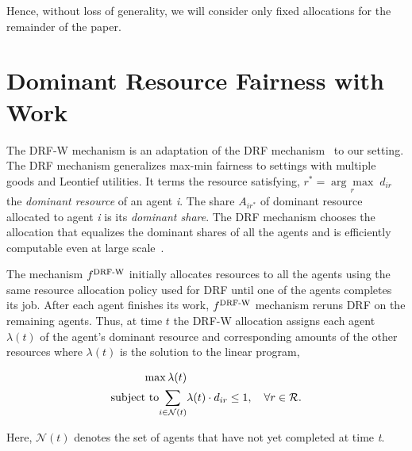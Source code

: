 \documentclass[letterpaper]{article} %
\theoremstyle{definition}
\begin{document}
Hence, without loss of generality, we will consider only fixed allocations for the remainder of the paper. 

\section{Dominant Resource Fairness with Work} \label{drf-w}
The DRF-W mechanism is an adaptation of the DRF mechanism~\cite{Ghodsi2011drf,parkes2015beyond} to our setting.
The DRF mechanism generalizes max-min fairness to settings with multiple goods and Leontief utilities.
It terms the resource satisfying, $r^{*} = \underset{r}{\arg \max} \; d_{ir}$ the {\em dominant resource} of an agent \textit{i}. The share $A_{ir^{*}}$ of dominant resource allocated to agent \textit{i} is its {\em dominant share}. The DRF mechanism chooses the allocation that equalizes the dominant shares of all the agents and is efficiently computable even at large scale~\cite{kash2018dc}.

The mechanism $f^{\textnormal{DRF-W}}$ initially allocates resources to all the agents using the same resource allocation policy used for DRF until one of the agents completes its job. After each agent finishes its work, ${f}^{\textnormal{DRF-W}}$ mechanism reruns DRF on the remaining agents. Thus, at time $t$ the DRF-W allocation assigns each agent $\lambda(t)$ of the agent's dominant resource and corresponding amounts of the other resources where $\lambda(t)$ is the solution to the linear program,
\begin{linenomath}
\begin{align*} \label{eq:1}
\begin{split}
\max \lambda(t) & 
\\ \textnormal{subject to} \underset{i \in \mathcal{N}(t)}{\displaystyle \sum} & \lambda(t) \cdot d_{ir} \leq 1, \quad \forall r \in \mathcal{R}.    
\end{split}
\end{align*}
\end{linenomath}
\noindent Here, $\mathcal{N}(t)$ denotes the set of agents that have not yet completed at time \textit{t}.
\end{document}
